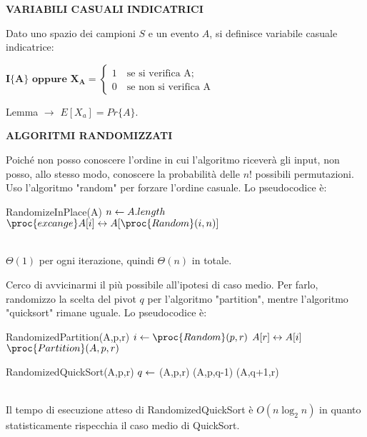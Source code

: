 \documentclass[8pt]{extarticle}
\begin{document}
\begin{formulario}
		\begin{tcenter}
\bf{VARIABILI CASUALI INDICATRICI}
		\end{tcenter}
Dato uno spazio dei campioni $S$ e un evento $A$, si definisce variabile casuale indicatrice:
		\begin{tcenter}
$\bm{I\{A\}\text{ oppure }X_A=}		
		\begin{cases} 
1 \quad\text{se si verifica A;}\\
0 \quad\text{se non si verifica A}  
		\end{cases}$
		\end{tcenter}
		\begin{descr}{0}
\item[Lemma] $\rightarrow$ $E[X_a]=Pr\{ A \}$.
		\end{descr}
\myRule

		\begin{tcenter}
\bf{ALGORITMI RANDOMIZZATI}
		\end{tcenter}
Poiché non posso conoscere l'ordine in cui l'algoritmo riceverà gli input, non posso, allo stesso modo, conoscere la probabilità delle $n!$ possibili permutazioni. Uso l'algoritmo "random" per forzare l'ordine casuale. Lo pseudocodice è:
		\begin{code}{RandomizeInPlace(A)}
\li $n \leftarrow A.length$
\li {}
	\li $\proc{excange } A[i]\sse A[\proc{Random}(i,n)]$
\End
		\end{code}
\\
$\Theta(1)$ per ogni iterazione, quindi $\Theta(n)$ in totale.
\myRule

		\begin{tcenter}
		\end{tcenter}
Cerco di avvicinarmi il più possibile all'ipotesi di caso medio. Per farlo, randomizzo la scelta del pivot $q$ per l'algoritmo "partition", mentre l'algoritmo "quicksort" rimane uguale. Lo pseudocodice è: 
		\begin{code}{RandomizedPartition(A,p,r)}
\li $i\la \proc{Random}(p,r)$
\li {}$A[r]\leftrightarrow A[i]$
\li \Return $\proc{Partition} (A,p,r)$

		\end{code}
		\begin{code}{RandomizedQuickSort(A,p,r)}
\li {}
	\li $q\leftarrow$ (A,p,r)
	\li {}(A,p,q-1)
	\li {}(A,q+1,r)
\End
		\end{code}
\\
Il tempo di esecuzione atteso di RandomizedQuickSort è $O(n\log_2n)$ in quanto statisticamente rispecchia il caso medio di QuickSort. 
\myRule


\end{formulario}
\end{document}
